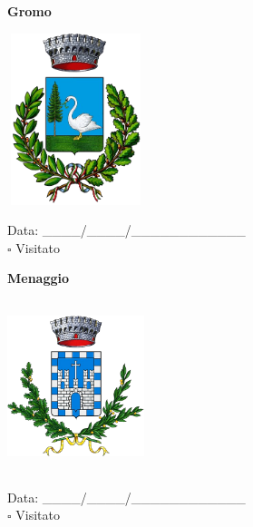 \documentclass[a5paper,12pt]{article}
\begin{document}
\newpage

\noindent
\begin{minipage}[t]{0.45\textwidth}
    \begin{center}
        \textbf{Gromo}
    \end{center}
    \vspace{-0.5cm} %
    \begin{center}
        \includegraphics[height= 5cm, width=4cm]{Lombardia/Stemma Gromo.png}
    \end{center}
    \vspace{-0.4cm} %
    \begin{flushleft}
        Data: \_\_\_\_/\_\_\_\_/\_\_\_\_\_\_\_\_\_\_\_\_ \\
        $\square$ Visitato
    \end{flushleft}
\end{minipage}
\hfill
\noindent
\begin{minipage}[t]{0.45\textwidth}
    \begin{center}
        \textbf{Menaggio}
    \end{center}
    \vspace{-0.5cm} %
    \begin{center}
        \includegraphics[height= 5cm, width=4cm]{Lombardia/Stemma Menaggio.png}
    \end{center}
    \vspace{-0.4cm} %
    \begin{flushleft}
        Data: \_\_\_\_/\_\_\_\_/\_\_\_\_\_\_\_\_\_\_\_\_ \\
        $\square$ Visitato
    \end{flushleft}
\end{minipage}
\end{document}
